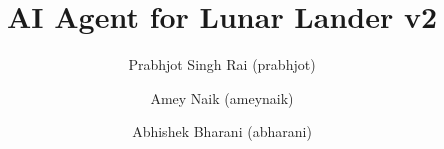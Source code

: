 \documentclass[11pt]{llncs}
\begin{document}
\pagestyle{empty} 
\title{AI Agent for Lunar Lander v2}
\author{Prabhjot Singh Rai (prabhjot)\institute{}
\and
Amey Naik (ameynaik)\institute{}
\and 
Abhishek Bharani (abharani)\institute{}
}

\maketitle




\pagestyle{plain}


\end{document}
